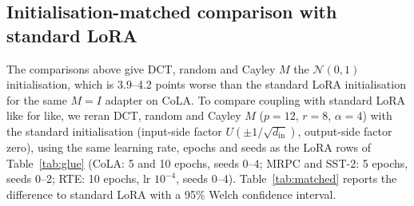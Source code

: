 \documentclass{article}
\theoremstyle{plain}
\begin{document}
\subsection{Initialisation-matched comparison with standard LoRA}
\label{sec:matched}

The comparisons above give DCT, random and Cayley $M$ the $\mathcal{N}(0,1)$ initialisation, which is 3.9--4.2 points worse than the standard LoRA initialisation for the
same $M=I$ adapter on CoLA.
To compare coupling with standard LoRA like for like, we reran DCT, random and Cayley $M$ ($p=12$, $r=8$, $\alpha=4$) with the standard initialisation
(input-side factor $U(\pm1/\sqrt{d_\mathrm{in}})$, output-side factor zero), using the same learning rate, epochs and seeds as the LoRA rows of Table~\ref{tab:glue}
(CoLA: 5 and 10 epochs, seeds 0--4; MRPC and SST-2: 5 epochs, seeds 0--2; RTE: 10 epochs, lr $10^{-4}$, seeds 0--4).
Table~\ref{tab:matched} reports the difference to standard LoRA with a 95\% Welch confidence interval.

\begin{table}[h]
\centering
\caption{Coupling vs.\ standard LoRA at matched initialisation, learning rate, epochs and seeds. Entries are the mean score of each method (final epoch),
with the difference to standard LoRA and its 95\% Welch confidence interval in points (MCC $\times100$ for CoLA, accuracy $\times100$ otherwise) below.
$n$ as in Table~\ref{tab:glue}. All differences are consistent with zero.}
\label{tab:matched}
\small
\setlength{\tabcolsep}{3pt}
\end{table}
\end{document}
